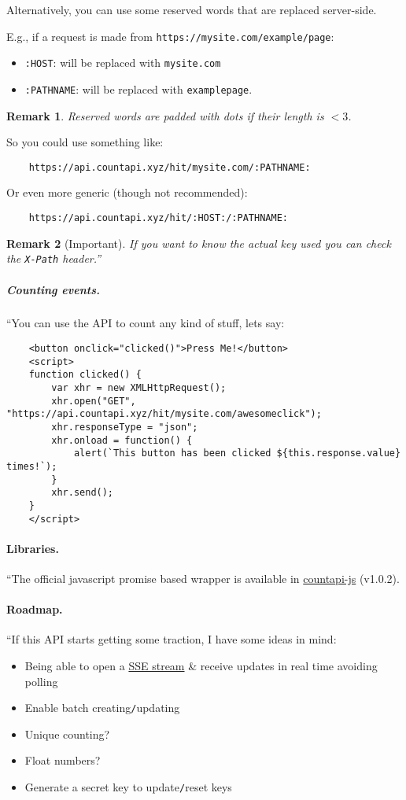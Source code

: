 \documentclass{article}
\numberwithin{equation}{section}
\newtheorem{remark}{Remark}[section]
\begin{document}
Alternatively, you can use some reserved words that are replaced server-side.

E.g., if a request is made from \texttt{https://mysite.com/example/page}:
\begin{itemize}
	\item \texttt{:HOST}: will be replaced with \texttt{mysite.com}
	\item \texttt{:PATHNAME}: will be replaced with \texttt{examplepage}.
\end{itemize}

\begin{remark}
	Reserved words are padded with dots if their length is $< 3$.
\end{remark}
So you could use something like:
\begin{verbatim}
	https://api.countapi.xyz/hit/mysite.com/:PATHNAME:
\end{verbatim}
Or even more generic (though not recommended):
\begin{verbatim}
	https://api.countapi.xyz/hit/:HOST:/:PATHNAME:
\end{verbatim}

\begin{remark}[Important]
	If you want to know the actual key used you can check the \verb|X-Path| header.''
\end{remark}

\subparagraph{Counting events.} ``You can use the API to count any kind of stuff, lets say:
\begin{verbatim}
	<button onclick="clicked()">Press Me!</button>
	<script>
	function clicked() {
	    var xhr = new XMLHttpRequest();
	    xhr.open("GET", "https://api.countapi.xyz/hit/mysite.com/awesomeclick");
	    xhr.responseType = "json";
	    xhr.onload = function() {
	        alert(`This button has been clicked ${this.response.value} times!`);
	    }
	    xhr.send();
	}
	</script>
\end{verbatim}

\paragraph{Libraries.} ``The official javascript promise based wrapper is available in \href{https://www.npmjs.com/package/countapi-js}{countapi-js} (v1.0.2).

\paragraph{Roadmap.} ``If this API starts getting some traction, I have some ideas in mind:
\begin{itemize}
	\item Being able to open a \href{https://developer.mozilla.org/en-US/docs/Web/API/Server-sent_events/Using_server-sent_events#Receiving_events_from_the_server}{SSE stream} \& receive updates in real time avoiding polling
	\item Enable batch creating\texttt{/}updating
	\item Unique counting?
	\item Float numbers?
	\item Generate a secret key to update\texttt{/}reset keys
\end{itemize}
\end{document}
